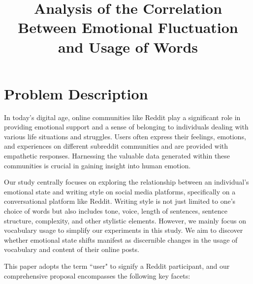 \documentclass[conference,compsoc]{IEEEtran}
\begin{document}
\title{Analysis of the Correlation Between Emotional Fluctuation and Usage of Words}

\author{
\and
{}
}

\maketitle
\thispagestyle{plain}
\pagestyle{plain}

\section{Problem Description} \label{problem_description}
In today's digital age, online communities like Reddit play a significant role in providing emotional support and a sense of belonging to individuals dealing with various life situations and struggles. Users often express their feelings, emotions, and experiences on different subreddit communities and are provided with empathetic responses. Harnessing the valuable data generated within these communities is crucial in gaining insight into human emotion. 

Our study centrally focuses on exploring the relationship between an individual's emotional state and writing style on social media platforms, specifically on a conversational platform like Reddit. Writing style is not just limited to one's choice of words but also includes tone, voice, length of sentences, sentence structure, complexity, and other stylistic elements. However, we mainly focus on vocabulary usage to simplify our experiments in this study. We aim to discover whether emotional state shifts manifest as discernible changes in the usage of vocabulary and content of their online posts.

This paper adopts the term ``user" to signify a Reddit participant, and our comprehensive proposal encompasses the following key facets:
\end{document}
